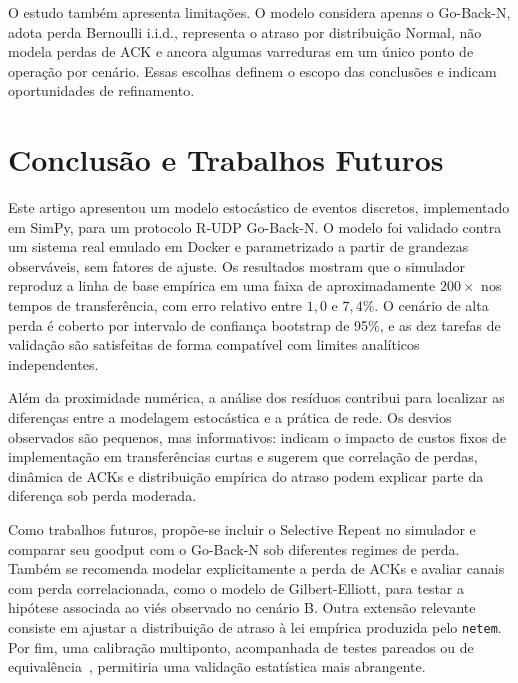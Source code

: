 \documentclass[12pt]{article}
\begin{document}
O estudo também apresenta limitações. O modelo considera apenas o Go-Back-N, adota perda
Bernoulli i.i.d., representa o atraso por distribuição Normal, não modela perdas de ACK e
ancora algumas varreduras em um único ponto de operação por cenário. Essas escolhas
definem o escopo das conclusões e indicam oportunidades de refinamento.

\section{Conclusão e Trabalhos Futuros}

Este artigo apresentou um modelo estocástico de eventos discretos, implementado em SimPy,
para um protocolo R-UDP Go-Back-N. O modelo foi validado contra um sistema real emulado em
Docker e parametrizado a partir de grandezas observáveis, sem fatores de ajuste. Os
resultados mostram que o simulador reproduz a linha de base empírica em uma faixa de
aproximadamente $200\times$ nos tempos de transferência, com erro relativo entre $1{,}0$ e
$7{,}4\%$. O cenário de alta perda é coberto por intervalo de confiança bootstrap de 95\%,
e as dez tarefas de validação são satisfeitas de forma compatível com limites analíticos
independentes.

Além da proximidade numérica, a análise dos resíduos contribui para localizar as diferenças
entre a modelagem estocástica e a prática de rede. Os desvios observados são pequenos, mas
informativos: indicam o impacto de custos fixos de implementação em transferências curtas e
sugerem que correlação de perdas, dinâmica de ACKs e distribuição empírica do atraso podem
explicar parte da diferença sob perda moderada.

Como trabalhos futuros, propõe-se incluir o Selective Repeat no simulador e comparar seu
goodput com o Go-Back-N sob diferentes regimes de perda. Também se recomenda modelar
explicitamente a perda de ACKs e avaliar canais com perda correlacionada, como o modelo de
Gilbert-Elliott, para testar a hipótese associada ao viés observado no cenário B. Outra
extensão relevante consiste em ajustar a distribuição de atraso à lei empírica produzida
pelo \texttt{netem}. Por fim, uma calibração multiponto, acompanhada de testes pareados ou
de equivalência~\cite{jain1991}, permitiria uma validação estatística mais abrangente.

\FloatBarrier


\end{document}
